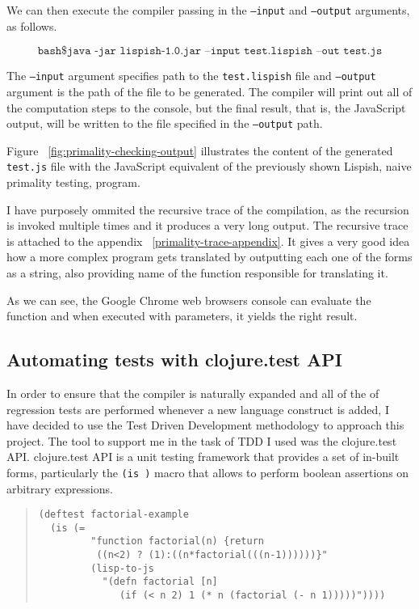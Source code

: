 We can then execute the compiler passing in the \texttt{--input} and \texttt{--output} arguments, as follows.

$$  \texttt{bash\$ java -jar lispish-1.0.jar --input test.lispish --out test.js} $$

The \texttt{--input} argument specifies path to the \texttt{test.lispish} file and \texttt{--output} argument is the path of the file to be generated.
The compiler will print out all of the computation steps to the console, but the final result, that is, the JavaScript output, will be written to the file specified in the \texttt{--output} path.

Figure ~\ref{fig:primality-checking-output} illustrates the content of the generated \texttt{test.js} file with the JavaScript equivalent of the previously shown Lispish, naive primality testing, program. 

I have purposely ommited the recursive trace of the compilation, as the recursion is invoked multiple times and it produces a very long output. 
The recursive trace is attached to the appendix ~\ref{primality-trace-appendix}. It gives a very good idea how a more complex program gets translated by outputting each one of the forms as a string, also providing name of the function responsible for translating it. 

As we can see, the Google Chrome web browsers console can evaluate the function and when executed with parameters, it yields the right result. 

\subsection{Automating tests with clojure.test API}
In order to ensure that the compiler is naturally expanded and all of the of regression tests are performed whenever a new language construct is added, I have decided to use the Test Driven Development methodology to approach this project. 
The tool to support me in the task of TDD I used was the clojure.test API.
clojure.test API\cite{clojure.test:2011:Site} is a unit testing framework that provides a set of in-built forms, particularly the \texttt{(is )} macro that allows to perform boolean assertions on arbitrary expressions. 

\begin{quote}
\begin{verbatim}
(deftest factorial-example
  (is (= 
         "function factorial(n) {return 
          ((n<2) ? (1):((n*factorial(((n-1))))))}"
         (lisp-to-js 
           "(defn factorial [n] 
              (if (< n 2) 1 (* n (factorial (- n 1)))))"))))
\end{verbatim}
\end{quote}

